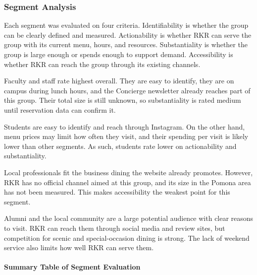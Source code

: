 \documentclass[
  12pt,
  letterpaper,
  DIV=11,
  numbers=noendperiod]{scrartcl}
\makeatletter
\let\oldparagraph\paragraph
\renewcommand{\paragraph}{
    \@ifstar
      \xxxParagraphStar
      \xxxParagraphNoStar
  }
\newcommand{\xxxParagraphStar}[1]{\oldparagraph*{#1}\mbox{}}
\newcommand{\xxxParagraphNoStar}[1]{\oldparagraph{#1}\mbox{}}
\makeatother
\begin{document}
\subsubsection{Segment Analysis}\label{segment-analysis}

Each segment was evaluated on four criteria. Identifiability is whether
the group can be clearly defined and measured. Actionability is whether
RKR can serve the group with its current menu, hours, and resources.
Substantiality is whether the group is large enough or spends enough to
support demand. Accessibility is whether RKR can reach the group through
its existing channels.

Faculty and staff rate highest overall. They are easy to identify, they
are on campus during lunch hours, and the Concierge newsletter already
reaches part of this group. Their total size is still unknown, so
substantiality is rated medium until reservation data can confirm it.

Students are easy to identify and reach through Instagram. On the other
hand, menu prices may limit how often they visit, and their spending per
visit is likely lower than other segments. As such, students rate lower
on actionability and substantiality.

Local professionals fit the business dining the website already
promotes. However, RKR has no official channel aimed at this group, and
its size in the Pomona area has not been measured. This makes
accessibility the weakest point for this segment.

Alumni and the local community are a large potential audience with clear
reasons to visit. RKR can reach them through social media and review
sites, but competition for scenic and special-occasion dining is strong.
The lack of weekend service also limits how well RKR can serve them.

\paragraph{\texorpdfstring{\textbf{Summary Table of Segment
Evaluation}}{Summary Table of Segment Evaluation}}\label{summary-table-of-segment-evaluation}
\end{document}
